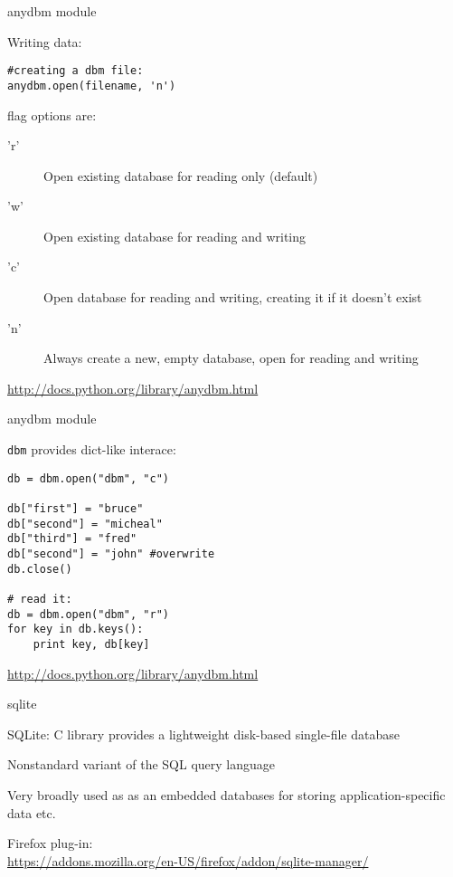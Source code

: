 \documentclass{beamer}
\begin{document}
\begin{frame}[fragile]{anydbm module}

{\Large Writing data:}

\begin{verbatim}
#creating a dbm file:
anydbm.open(filename, 'n') 
\end{verbatim}

{\large flag options are: }
\begin{description}
  \item['r'] 	Open existing database for reading only (default)
  \item['w'] 	Open existing database for reading and writing
  \item['c'] 	Open database for reading and writing, creating it if it doesn’t exist
  \item['n'] 	Always create a new, empty database, open for reading and writing
\end{description}
\vfill
\url{http://docs.python.org/library/anydbm.html}
\end{frame}

\begin{frame}[fragile]{anydbm module}

{\Large \verb|dbm| provides dict-like interace:}

\begin{verbatim}
db = dbm.open("dbm", "c")

db["first"] = "bruce"
db["second"] = "micheal"
db["third"] = "fred"
db["second"] = "john" #overwrite
db.close()

# read it:
db = dbm.open("dbm", "r")
for key in db.keys():
    print key, db[key]
\end{verbatim}

\vfill
\url{http://docs.python.org/library/anydbm.html}
\end{frame}



\begin{frame}[fragile]{sqlite}

\vfill
{\Large SQLite: C library provides a lightweight disk-based single-file database}

\vfill
{\Large Nonstandard variant of the SQL query language}

\vfill
{\Large Very broadly used as as an embedded databases for storing
        application-specific data etc.}

\vfill
Firefox plug-in:\\
\url{https://addons.mozilla.org/en-US/firefox/addon/sqlite-manager/}
\end{frame} 
\end{document}
